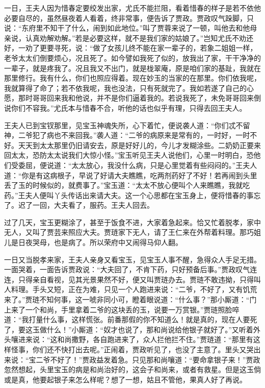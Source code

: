 \begin{parag}
    一日，王夫人因为惜春定要绞发出家，尤氏不能拦阻，看着惜春的样子是若不依他必要自尽的，虽然昼夜着人看着，终非常事，便告诉了贾政。贾政叹气跺脚，只说：“东府里不知干了什么，闹到如此地位。”叫了贾蓉来说了一顿，叫他去和他母亲说，认真劝解劝解。”若是必要这样，就不是我们家的姑娘了。”岂知尤氏不劝还好，一劝了更要寻死，说：“做了女孩儿终不能在家一辈子的，若象二姐姐一样，老爷太太们倒要烦心，况且死了。如今譬如我死了似的，放我出了家，干干净净的一辈子，就是疼我了。况且我又不出门，就是栊翠庵，原是咱们家的基趾，我就在那里修行。我有什么，你们也照应得着。现在妙玉的当家的在那里。你们依我呢，我就算得了命了；若不依我呢，我也没法，只有死就完了。我如若遂了自己的心愿，那时哥哥回来我和他说，并不是你们逼着我的。若说我死了，未免哥哥回来倒说你们不容我。”尤氏本与惜春不合，听他的话也似乎有理，只得去回王夫人。
\end{parag}


\begin{parag}
    王夫人已到宝钗那里，见宝玉神魂失所，心下着忙，便说袭人道：“你们忒不留神，二爷犯了病也不来回我。”袭人道：“二爷的病原来是常有的，一时好，一时不好。天天到太太那里仍旧请安去，原是好好儿的，今儿才发糊涂些。二奶奶正要来回太太，恐防太太说我们大惊小怪。”宝玉听见王夫人说他们，心里一时明白，恐他们受委屈，便说道：“太太放心，我没什么病，只是心里觉着有些闷闷的。”王夫人道：“你是有这病根子，早说了好请大夫瞧瞧，吃两剂药好了不好！若再闹到头里丢了玉的时候似的，就费事了。”宝玉道：“太太不放心便叫个人来瞧瞧，我就吃药。”王夫人便叫丫头传话出来请大夫。这一个心思都在宝玉身上，便将惜春的事忘了。迟了一回，大夫看了，服药。王夫人回去。
\end{parag}


\begin{parag}
    过了几天，宝玉更糊涂了，甚至于饭食不进，大家着急起来。恰又忙着脱孝，家中无人，又叫了贾芸来照应大夫。贾琏家下无人，请了王仁来在外帮着料理。那巧姐儿是日夜哭母，也是病了。所以荣府中又闹得马仰人翻。
\end{parag}


\begin{parag}
    一日又当脱孝来家，王夫人亲身又看宝玉，见宝玉人事不醒，急得众人手足无措。一面哭着，一面告诉贾政说：“大夫回了，不肯下药，只好预备后事。”贾政叹气连连，只得亲自看视，见其光景果然不好，便又叫贾琏办去。贾琏不敢违拗，只得叫人料理。手头又短，正在为难，只见一个人跑进来说：“二爷，不好了，又有饥荒来了。”贾琏不知何事，这一唬非同小可，瞪着眼说道：“什么事？”那小厮道：“门上来了一个和尚，手里拿着二爷的这块丢的玉，说要一万赏银。”贾琏照脸啐道：“我打量什么事，这样慌张。前番那假的你不知道么！就是真的，现在人要死了，要这玉做什么！”小厮道：“奴才也说了，那和尚说给他银子就好了。”又听着外头嚷进来说：“这和尚撒野，各自跑进来了，众人拦他拦不住。”贾琏道：“那里有这样怪事，你们还不快打出去呢。”正闹着，贾政听见了，也没了主意了。里头又哭出来说：“宝二爷不好了！”贾政益发着急。只见那和尚嚷道：“要命拿银子来！”贾政忽然想起，头里宝玉的病是和尚治好的，这会子和尚来，或者有救星。但是这玉倘或是真，他要起银子来怎么样呢？想了一想，姑且不管他，果真人好了再说。
\end{parag}


